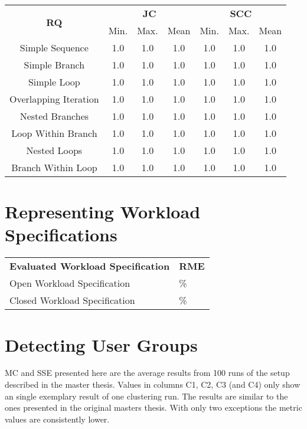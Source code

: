 \documentclass[10pt,a4paper]{article}
\begin{document}
\begin{table}[H]
	\centering
	\begin{tabular}{|c||c|c|c||c|c|c|}
		\hline
		\multirow{2}{*}{\textbf{RQ}}
		 & \multicolumn{3}{c||}{\textbf{JC}} & \multicolumn{3}{c|}{\textbf{SCC}} \\
		 \cline{2-7}
		 & Min. & Max. & Mean & Min. & Max. & Mean \\
		\hhline{|=======|}
		Simple Sequence & 1.0 & 1.0 & 1.0 & 1.0 & 1.0 & 1.0 \\
		\hline
		Simple Branch & 1.0 & 1.0 & 1.0 & 1.0 & 1.0 & 1.0 \\
		\hline
		Simple Loop & 1.0 & 1.0 & 1.0 & 1.0 & 1.0 & 1.0 \\
		\hline
		Overlapping Iteration & 1.0 & 1.0 & 1.0 & 1.0 & 1.0 & 1.0 \\
		\hline
		Nested Branches & 1.0 & 1.0 & 1.0 & 1.0 & 1.0 & 1.0 \\
		\hline
		Loop Within Branch & 1.0 & 1.0 & 1.0 & 1.0 & 1.0 & 1.0 \\
		\hline
		Nested Loops & 1.0 & 1.0 & 1.0 & 1.0 & 1.0 & 1.0 \\
		\hline
		Branch Within Loop & 1.0 & 1.0 & 1.0 & 1.0 & 1.0 & 1.0 \\
		\hline
	\end{tabular}
\end{table}


\section{Representing Workload Specifications}
\begin{table}[H]
	\centering
	\begin{tabular}{|>{\centering\arraybackslash}p{6cm}||>{\centering\arraybackslash}p{5cm}|}
		\hline
		\textbf{Evaluated Workload Specification} & \textbf{RME} \\
		\hhline{|==|}
		Open Workload Specification & 0.0\%  \\
		\hline
		Closed Workload Specification & 13.1\%  \\
		\hline
	\end{tabular}
\end{table}

\section{Detecting User Groups}
MC and SSE presented here are the average results from 100 runs of the setup described in the master thesis. Values in columns C1, C2, C3 (and C4) only show an single exemplary result of one clustering run. The results are similar to the ones presented in the original masters thesis. With only two exceptions the metric values are consistently lower.\\
\end{document}
